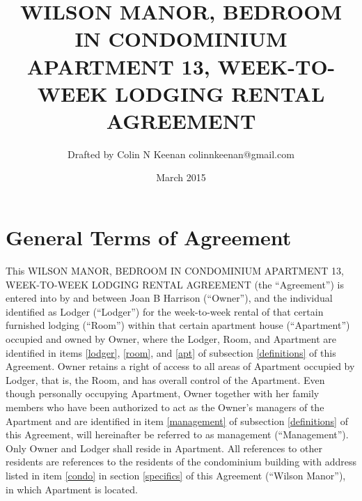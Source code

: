 \documentclass[12pt,letterpaper]{article}
\newcommand{\agreementtitle}{WILSON MANOR, BEDROOM IN CONDOMINIUM APARTMENT 13, WEEK-TO-WEEK LODGING RENTAL AGREEMENT}
\newcommand{\lodger}{Lodger}
\newcommand{\generals}{General Terms of Agreement}
\newcommand{\mom}{Joan B Harrison}
\newcommand{\management}{Management}
\newcommand{\condo}{Wilson Manor}
\newcommand{\apt}{Apartment}
\newcommand{\room}{Room}
\begin{document}
\title{\agreementtitle{}}
\author{Drafted by Colin N Keenan colinnkeenan@gmail.com}
\date{March 2015}
\maketitle
\thispagestyle{fancy}

\noindent \hrulefill
\section{\generals{}} \label{generals}
This \agreementtitle{} (the ``Agreement'') is entered into by and between \mom{} (``Owner''), and the individual identified as \lodger{} (``\lodger{}'') for the week-to-week rental of that certain furnished lodging (``\room{}'') within that certain apartment house (``\apt{}'') occupied and owned by Owner, where the \lodger{}, \room{}, and \apt{} are identified in items \ref{lodger}, \ref{room}, and \ref{apt} of subsection \ref{definitions} of this Agreement. Owner retains a right of access to all areas of \apt{} occupied by \lodger{}, that is, the \room{}, and has overall control of the \apt{}. Even though personally occupying \apt{}, Owner together with her family members who have been authorized to act as the Owner's managers of the \apt{} and are identified in item \ref{management} of subsection \ref{definitions} of this Agreement, will hereinafter be referred to as management (``\management{}''). Only Owner and \lodger{} shall reside in \apt{}. All references to other residents are references to the residents of the condominium building with address listed in item \ref{condo} in section \ref{specifics} of this Agreement (``\condo{}''), in which \apt{} is located.
\end{document}
